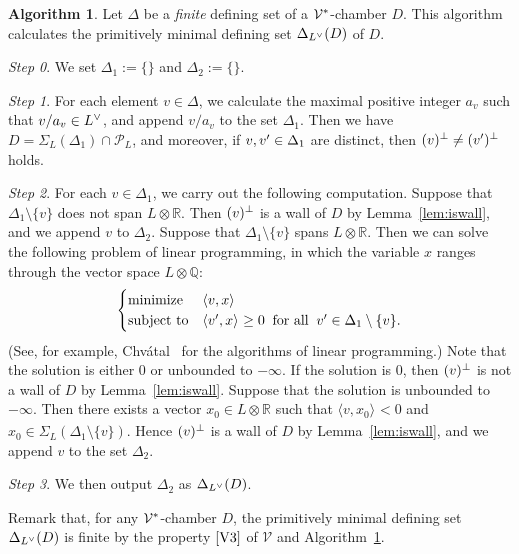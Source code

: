 \documentclass{amsart}
\theoremstyle{plain}
\theoremstyle{definition}
\newtheorem{algorithm}[theorem]{Algorithm}
\theoremstyle{remark}
\numberwithin{equation}{section}
\numberwithin{table}{section}
\numberwithin{figure}{section}
\newcommand{\step}[1]{{\it Step #1}}
\newcommand{\Q}{\mathord{\mathbb  Q}}
\newcommand{\R}{\mathord{\mathbb R}}
\newcommand{\PPP}{\mathord{\mathcal P}}
\newcommand{\VVV}{\mathord{\mathcal V}}
\newcommand{\tensor}{\otimes}
\newcommand{\sprime}{\sp\prime}
\newcommand{\sperp}{\sp{\perp}}
\newcommand{\dual}{\sp{\vee}}
\newcommand{\intM}[2]{\langle{#1}\rangle_{#2}}
\newcommand{\sphyp}{\sp*}
\newcommand{\propVthree}{\mathord{\rm [V3]}}
\begin{document}
 \begin{algorithm}\label{algorithm:mindefset}
Let $\Delta$ be a \emph{finite} defining set of  a $\VVV\sphyp$-chamber $D$.
This algorithm calculates  the primitively minimal defining set $\Delta_{L\dual}(D)$ of $D$.
 
 
\step{0}. We set $\Delta_1:=\{\}$ and $\Delta_2:=\{\}$.


\step{1}.
For each element $v\in \Delta$,
we calculate the  maximal positive integer $a_v$ such that
$v/a_{v}\in L\dual$,
and append $v/a_{v}$ to the set $\Delta_1$.
Then we have $D=\Sigma_L(\Delta_1)\cap \PPP_L$,
and moreover, if $v, v\sprime\in \Delta_1$ are distinct,
then $(v)\sperp\ne (v\sprime)\sperp$ holds.


\step{2}.
For each $v\in \Delta_1$, we carry out the following computation.
Suppose that $\Delta_1\setminus\{v\}$  does not span $L\tensor \R$.
Then $(v)\sperp$ is a wall of $D$  by Lemma~\ref{lem:iswall},
and we append $v$ to $\Delta_2$.
Suppose that $\Delta_1\setminus\{v\}$  spans $L\tensor \R$.
%
Then 
we can solve the following  problem of linear programming,
in which the variable $x$ ranges through  the vector space $L\tensor\Q$:
%
\begin{equation}\label{eq:LP}
\begin{cases}
\textrm{minimize} &  \intM{v, x}{}\\
\textrm{subject to} & \intM{v\sprime, x}{}\ge 0 \;\; \textrm{for all}\;\; v\sprime \in \Delta_1\setminus \{v\}.
\end{cases}
\end{equation}
%
(See, for example,  Chv\'atal~\cite{MR717219} for the algorithms  of linear programming.)
Note that the solution is either $0$ or unbounded to $-\infty$.
If the solution is $0$, then $(v)\sperp$ is not a wall of $D$
by Lemma~\ref{lem:iswall}.
Suppose that the solution is unbounded to $-\infty$.
Then there exists a vector $x_0\in L\tensor\R$ such that 
$\intM{v, x_0}{}<0$ and $x_0\in \Sigma_L(\Delta_1\setminus \{v\})$.
Hence $(v)\sperp$ is a wall of $D$ by Lemma~\ref{lem:iswall}, and 
we append $v$ to the set $\Delta_2$.



\step{3}. We then output $\Delta_2$ as $\Delta_{L\dual}(D)$.
 \end{algorithm}
Remark that,
for any $\VVV\sphyp$-chamber $D$,
the primitively minimal defining set  $\Delta_{L\dual}(D)$ 
 is finite by the property $\propVthree$ of  $\VVV$ and Algorithm~\ref{algorithm:mindefset}.
\end{document}
